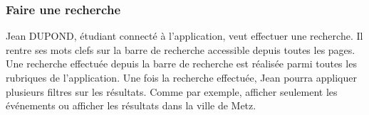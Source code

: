 \subsubsection*{Faire une recherche}
Jean DUPOND, étudiant connecté à l'application, veut effectuer une recherche. Il rentre ses mots clefs sur la barre de recherche accessible depuis toutes les pages. Une recherche effectuée depuis la barre de recherche est réalisée parmi toutes les rubriques de l'application. Une fois la recherche effectuée, Jean pourra appliquer plusieurs filtres sur les résultats. Comme par exemple, afficher seulement les événements ou afficher les résultats dans la ville de Metz.